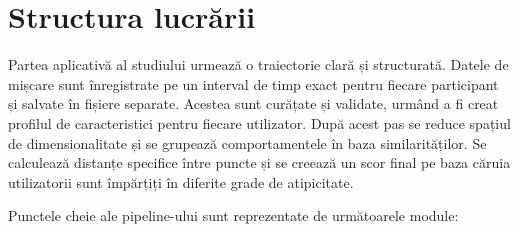 \documentclass[12pt,a4paper]{report}
\theoremstyle{definition}
\theoremstyle{remark}
\begin{document}
\section{Structura lucrării}

Partea aplicativă al studiului urmează o traiectorie clară și structurată. Datele de mișcare sunt înregistrate pe un interval de timp exact pentru fiecare participant și salvate în fișiere separate. Acestea sunt curățate și validate, urmând a fi creat profilul de caracteristici pentru fiecare utilizator. După acest pas se reduce spațiul de dimensionalitate și se grupează comportamentele în baza similarităților. Se calculează distanțe specifice între puncte și se creează un scor final pe baza căruia utilizatorii sunt împărțiți în diferite grade de atipicitate. 

Punctele cheie ale pipeline-ului sunt reprezentate de următoarele module:
\end{document}
